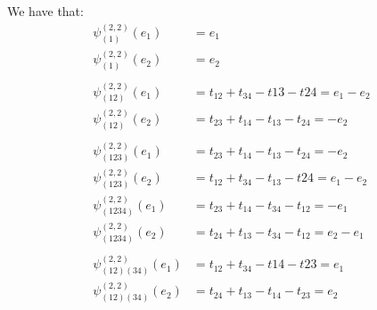 \documentclass[]{article}
\begin{document}
We have that:
\begin{align*}
	\psi^{(2,2)}_{(1)}(e_1) &= e_1\\
	\psi^{(2,2)}_{(1)}(e_2) &= e_2\\
	\\
	\psi^{(2,2)}_{(12)}(e_1) &= t_{12} + t_{34} - t{13} - t{24} = e_1 - e_2\\
	\psi^{(2,2)}_{(12)}(e_2) &=t_{23} + t_{14} - t_{13} - t_{24}= - e_2\\
	\\
	\psi^{(2,2)}_{(123)}(e_1) &=t_{23} + t_{14} - t_{13} - t_{24}= - e_2\\
	\psi^{(2,2)}_{(123)}(e_2) &= t_{12} + t_{34} - t_{13} - t{24} = e_1 - e_2
	\\
	\psi^{(2,2)}_{(1234)}(e_1) &= t_{23} + t_{14} - t_{34} - t_{12} = - e_1\\
	\psi^{(2,2)}_{(1234)}(e_2) &= t_{24} + t_{13} - t_{34} - t_{12} = e_2 - e_1\\
	\\
	\psi^{(2,2)}_{(12)(34)}(e_1) &= t_{12} + t_{34} - t{14} - t{23} = e_1\\
	\psi^{(2,2)}_{(12)(34)}(e_2) &= t_{24} + t_{13} - t_{14} - t_{23}= e_2
\end{align*}
\end{document}

